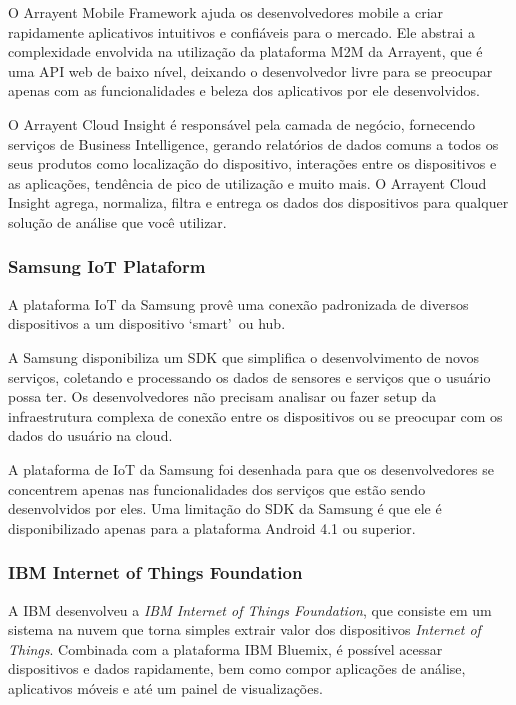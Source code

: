O Arrayent Mobile Framework ajuda os desenvolvedores mobile a criar rapidamente aplicativos intuitivos e
confiáveis para o mercado. Ele abstrai a complexidade envolvida na utilização da plataforma M2M da Arrayent,
que é uma API web de baixo nível, deixando o desenvolvedor livre para se preocupar apenas com as funcionalidades
e beleza dos aplicativos por ele desenvolvidos.

O Arrayent Cloud Insight é responsável pela camada de negócio, fornecendo serviços de Business Intelligence,
gerando relatórios de dados comuns a todos os seus produtos como localização do dispositivo, interações entre
os dispositivos e as aplicações, tendência de pico de utilização e muito mais. O Arrayent Cloud Insight agrega,
normaliza, filtra e entrega os dados dos dispositivos para qualquer solução de análise que você utilizar.

\subsubsection{Samsung IoT Plataform}
A plataforma IoT da Samsung provê uma conexão padronizada de diversos dispositivos a um dispositivo
\lq smart\rq\ ou hub.

A Samsung disponibiliza um SDK que simplifica o desenvolvimento de novos serviços, coletando
e processando os dados de sensores e serviços que o usuário possa ter. Os desenvolvedores não precisam analisar ou
fazer setup da infraestrutura complexa de conexão entre os dispositivos ou se preocupar com os dados do usuário na cloud.

A plataforma de IoT da Samsung foi desenhada para que os desenvolvedores se concentrem apenas nas funcionalidades
dos serviços que estão sendo desenvolvidos por eles. Uma limitação do SDK da Samsung é que ele é disponibilizado
apenas para a plataforma Android 4.1 ou superior.

\subsubsection{IBM Internet of Things Foundation}
A IBM desenvolveu a \textit{IBM Internet of Things Foundation}, que consiste em um sistema na nuvem que torna simples
extrair valor dos dispositivos \textit{Internet of Things}. Combinada com a plataforma IBM Bluemix\texttrademark,
é possível acessar dispositivos e dados rapidamente, bem como compor aplicações de análise, aplicativos móveis 
e até um painel de visualizações.

